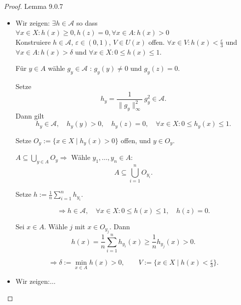 \begin{proof}{Lemma 9.0.7}\\
   \begin{itemize}
    \item[(1.)] Wir zeigen: $\exists h \in \mathcal{A}$ so dass
    $\forall x \in X: h(x) \geq 0, h(z) = 0, \forall x \in A: h(x) > 0$\\
    Konstruiere $h \in \mathcal{A}$, $\varepsilon \in (0,1)$, $V \in U(x)$ offen. 
    $\forall x \in V: h(x) < \frac{\varepsilon}{3}$ und 
    $\forall x \in A: h(x) > \delta$ 
    und $\forall x \in X: 0 \le h(x) \le 1$.

    Für $y \in A$ wähle $g_y \in \mathcal{A}$ : 
    $g_y(y) \neq 0$ und $g_y(z) = 0$.

    Setze 
    $$
        h_y = \frac{1}{\|g_y\|_\infty^2}\, g_y^2 \in \mathcal{A}.
    $$
    Dann gilt 
    $$
        h_y \in \mathcal{A},\quad h_y(y) > 0,\quad 
        h_y(z) = 0,\quad 
        \forall x \in X: 0 \le h_y(x) \le 1.
    $$

    Setze $O_y := \{x \in X \mid h_y(x) > 0\}$
    offen, und $y \in O_y$.

    $A \subseteq \bigcup_{y \in A} O_y 
    \Rightarrow$ Wähle $y_1,\dots, y_n \in A$:
    $$
        A \subseteq \bigcup_{i=1}^n O_{y_i}.
    $$

    Setze 
    $h := \frac{1}{n}\sum_{i=1}^n h_{y_i}.$

    $$ \Rightarrow
        h \in \mathcal{A},\quad 
        \forall x \in X: 0 \le h(x) \le 1,\quad 
        h(z) = 0.
    $$

    Sei $x \in A$. Wähle $j$ mit $x \in O_{y_j}$. Dann
    $$
        h(x) 
        = \frac{1}{n}\sum_{i=1}^n h_{y_i}(x)
        \ge \frac{1}{n} h_{y_j}(x)
        > 0.
    $$

    $$ \Rightarrow
        \delta := \min_{x \in A} h(x) > 0,
        \qquad 
        V := \{x \in X \mid h(x) < \tfrac{\varepsilon}{3}\}.
    $$
    \item[(2.)] Wir zeigen:$\dots$
    \end{itemize}
\end{proof} 